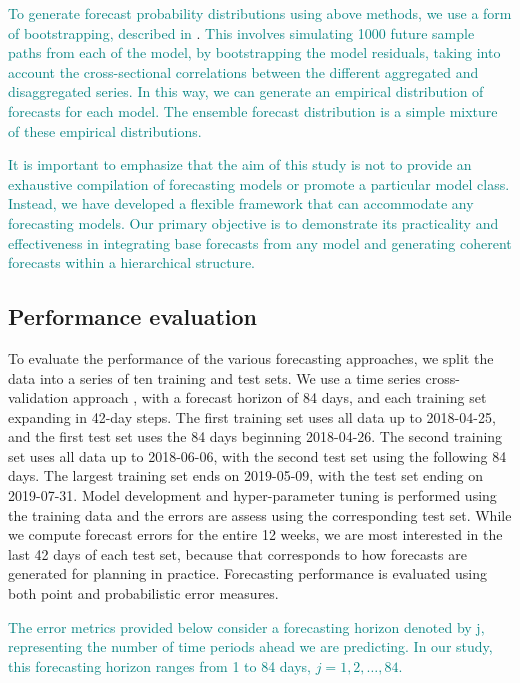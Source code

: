 \documentclass[
  authoryear,
  preprint,
  3p]{elsarticle}
\begin{document}
\textcolor{teal}{To generate forecast probability distributions using above methods, we use a form of bootstrapping, described in}
\citet{panagiotelis2023probabilistic}.
\textcolor{teal}{This involves simulating 1000 future sample paths from each of the model, by bootstrapping the model residuals, taking into account the cross-sectional correlations between the different aggregated and disaggregated series. In this way, we can generate an empirical distribution of forecasts for each model. The ensemble forecast distribution is a simple mixture of these empirical distributions.}

\textcolor{teal}{It is important to emphasize that the aim of this study is not to provide an exhaustive compilation of forecasting models or promote a particular model class. Instead, we have developed a flexible framework that can accommodate any forecasting models. Our primary objective is to demonstrate its practicality and effectiveness in integrating base forecasts from any model and generating coherent forecasts within a hierarchical structure.}

\hypertarget{performance-evaluation}{%
\subsection{Performance evaluation}\label{performance-evaluation}}

To evaluate the performance of the various forecasting approaches, we
split the data into a series of ten training and test sets. We use a
time series cross-validation approach \citep{hyndman2021forecasting},
with a forecast horizon of 84 days, and each training set expanding in
42-day steps. The first training set uses all data up to 2018-04-25, and
the first test set uses the 84 days beginning 2018-04-26. The second
training set uses all data up to 2018-06-06, with the second test set
using the following 84 days. The largest training set ends on
2019-05-09, with the test set ending on 2019-07-31. Model development
and hyper-parameter tuning is performed using the training data and the
errors are assess using the corresponding test set. While we compute
forecast errors for the entire 12 weeks, we are most interested in the
last 42 days of each test set, because that corresponds to how forecasts
are generated for planning in practice. Forecasting performance is
evaluated using both point and probabilistic error measures.

\textcolor{teal}{The error metrics provided below consider a forecasting horizon denoted by j, representing the number of time periods ahead we are predicting. In our study, this forecasting horizon ranges from 1 to 84 days, $j= 1,2,\dots, 84$.}
\end{document}
